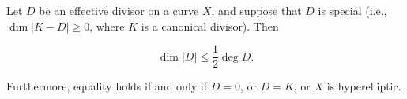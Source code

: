 Let $D$ be an effective divisor on a curve $X$, and suppose that $D$ is special (i.e., $\dim|K-D| \geqslant 0$, where $K$ is a canonical divisor). Then

$$\dim|D| \leqslant \frac{1}{2} \deg D.$$

Furthermore, equality holds if and only if $D = 0$, or $D = K$, or $X$ is hyperelliptic.
